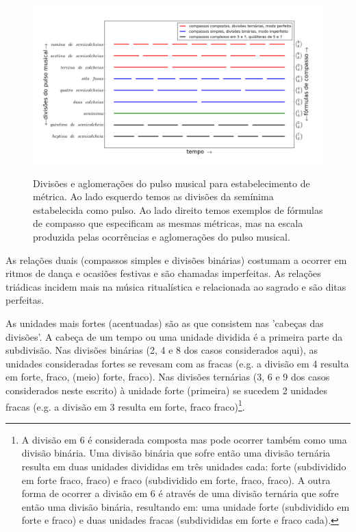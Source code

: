 \begin{figure}[h!]
    \centering
    \caption{Divisões e aglomerações do pulso musical para estabelecimento de métrica. Ao lado esquerdo temos as divisões da semínima estabelecida como pulso. Ao lado direito temos exemplos de fórmulas de compasso que especificam as mesmas métricas, mas na escala produzida pelas ocorrências e aglomerações do pulso musical.}
        \includegraphics[width=\textwidth]{figuras/metricaMusical}
        \label{fig:pulsoSubAgl}
\end{figure}

As relações duais (compassos simples e divisões binárias) costumam a ocorrer em ritmos de dança
e ocasiões festivas e são chamadas imperfeitas. As relações triádicas
incidem mais na música ritualística e relacionada ao sagrado
e são ditas perfeitas.

As unidades mais fortes (acentuadas) são as que consistem nas 'cabeças das divisões'. A cabeça de um tempo ou uma unidade dividida é a primeira parte da subdivisão. Nas divisões binárias (2, 4 e 8 dos casos considerados aqui),
as unidades consideradas fortes se revesam com as fracas
(e.g. a divisão em 4 resulta em forte, fraco, (meio) forte, fraco).
Nas divisões ternárias (3, 6 e 9 dos casos considerados neste escrito)
à unidade forte (primeira) se sucedem 2 unidades fracas (e.g. a divisão em 3 resulta em forte, fraco fraco)\footnote{A divisão em 6 é considerada composta
 mas pode ocorrer também como uma divisão binária.
 Uma divisão binária que sofre então uma divisão ternária
 resulta em duas unidades divididas em três unidades cada: forte (subdividido em forte fraco, fraco) e fraco (subdividido em forte, fraco, fraco).
A outra forma de ocorrer a divisão em 6 é através de 
uma divisão ternária que sofre então uma divisão binária, resultando em:
uma unidade forte (subdividido em forte e fraco) e duas unidades fracas (subdivididas em forte e fraco cada).}.

